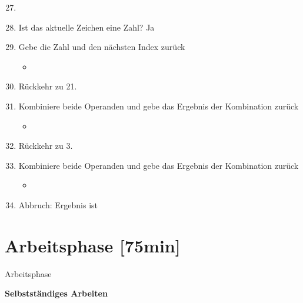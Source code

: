 \documentclass{../tuda-beamer}
\begin{document}
    \begin{frame}[c]
        \begin{figure}[h]
        \end{figure}

        \begin{enumerate}
            \setcounter{enumi}{26}
            \item {}
            \item Ist das aktuelle Zeichen eine Zahl? Ja
            \item Gebe die Zahl und den nächsten Index zurück
            \begin{itemize}
                \item {}
            \end{itemize}
            \item Rückkehr zu 21.
            \item Kombiniere beide Operanden und gebe das Ergebnis der Kombination zurück
            \begin{itemize}
                \item {}
            \end{itemize}
            \item Rückkehr zu 3.
            \item Kombiniere beide Operanden und gebe das Ergebnis der Kombination zurück
            \begin{itemize}
                \item {}
            \end{itemize}
            \item Abbruch: Ergebnis ist 
        \end{enumerate}
    \end{frame}


    \section{Arbeitsphase [75min]}
    \begin{frame}[c]{Arbeitsphase}
        \begin{center}
            \textbf{\LARGE Selbstständiges Arbeiten}
        \end{center}
    \end{frame}
\end{document}
